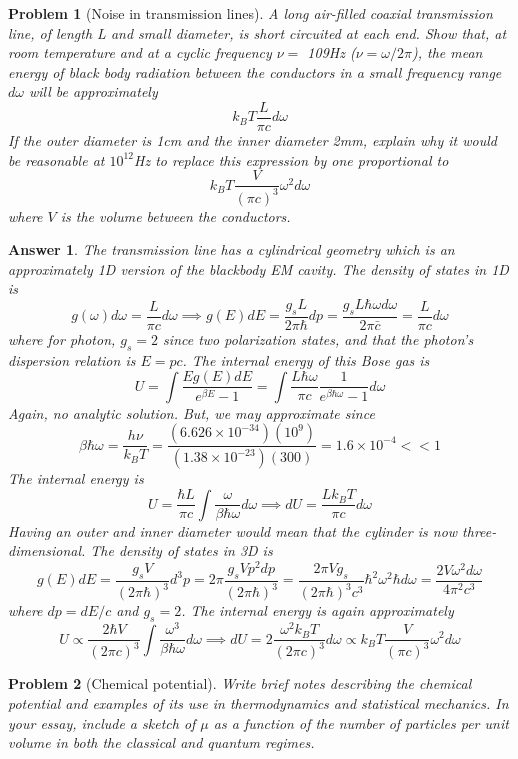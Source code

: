 \documentclass[a4paper]{article}
\theoremstyle{new2}
\newtheorem{ans}{Answer}[section]
\theoremstyle{new}
\newtheorem{qns}{Problem}[section]
\begin{document}
\newpage
\begin{qns}[Noise in transmission lines]
A long air-filled coaxial transmission line, of length L and small diameter, is short circuited at each end. Show that, at room temperature and at a cyclic frequency $\nu =$ 109Hz ($\nu = \omega/2\pi$), the mean energy of black body radiation between the conductors in a small frequency range $d\omega$ will be approximately
$$k_BT\frac{L}{\pi c}d\omega$$
If the outer diameter is 1cm and the inner diameter 2mm, explain why it would be reasonable at $10^{12}$Hz to replace this expression by one proportional to
$$k_BT\frac{V}{(\pi c)^3}\omega^2d\omega$$
where $V$ is the volume between the conductors.
\end{qns}
\begin{ans}
The transmission line has a cylindrical geometry which is an approximately 1D version of the blackbody EM cavity. The density of states in 1D is
$$g(\omega)d\omega=\frac{L}{\pi c}d\omega\implies g(E)dE=\frac{g_sL}{2\pi\hbar}dp=\frac{g_sL\hbar\omega d\omega}{2\pi\bar c}=\frac{L}{\pi c}d\omega$$
where for photon, $g_s=2$ since two polarization states, and that the photon's dispersion relation is $E=pc$. The internal energy of this Bose gas is
$$U=\int\frac{Eg(E)dE}{e^{\beta E}-1}=\int\frac{L\hbar\omega}{\pi c}\frac{1}{e^{\beta\hbar\omega}-1}d\omega$$
Again, no analytic solution. But, we may approximate since
$$\beta\hbar\omega=\frac{h\nu}{k_BT}=\frac{(6.626\times10^{-34})(10^9)}{(1.38\times10^{-23})(300)}=1.6\times10^{-4}<<1$$
The internal energy is
$$U=\frac{\hbar L}{\pi c}\int\frac{\omega}{\beta\hbar\omega}d\omega\implies dU=\frac{Lk_BT}{\pi c}d\omega$$
Having an outer and inner diameter would mean that the cylinder is now three-dimensional. The density of states in 3D is
$$g(E)dE=\frac{g_sV}{(2\pi\hbar)^3}d^3p=2\pi\frac{g_sVp^2dp}{(2\pi\hbar)^3}=\frac{2\pi Vg_s}{(2\pi\hbar)^3c^3}\hbar^2\omega^2\hbar d\omega=\frac{2V\omega^2d\omega}{4\pi^2 c^3}$$
where $dp=dE/c$ and $g_s=2$. The internal energy is again approximately
$$U\propto\frac{2\hbar V}{(2\pi c)^3}\int\frac{\omega^3}{\beta\hbar\omega}d\omega\implies dU=2\frac{\omega^2k_BT}{(2\pi c)^3}d\omega\propto k_BT\frac{V}{(\pi c)^3}\omega^2d\omega$$
\end{ans}
\newpage
\begin{qns}[Chemical potential]
Write brief notes describing the chemical potential and examples of its use in thermodynamics and statistical mechanics. In your essay, include a sketch of $\mu$ as a function of the number of particles per unit volume in both the classical and quantum regimes.
\end{qns}
\end{document}

